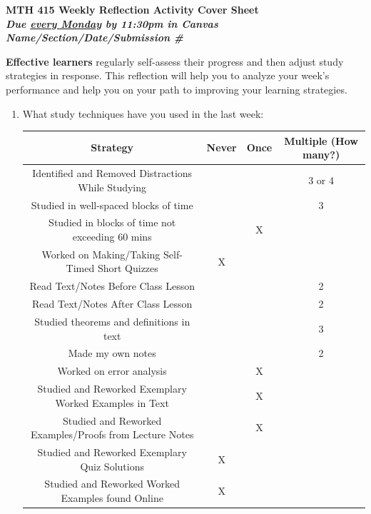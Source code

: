 \documentclass[10pt]{article}
\begin{document}
\begin{center}
\Large \bfseries MTH 415 Weekly Reflection Activity Cover Sheet\\ 
{\it Due \underline{every Monday} by 11:30pm in Canvas}\\ 
\smallskip
\it Name/Section/Date/Submission \# 
\end{center}

{\bf Effective learners} regularly self-assess their progress and then adjust study strategies in response. This reflection will help you to analyze your week's performance and help you on your path to improving your learning strategies.

\begin{enumerate}

\item What study techniques have you used in the last week:\\
	
	\begin{tabular}{|c|c|c|c|}
		\hline
		 {\bf Strategy} & {\bf Never} & {\bf Once} & {\bf Multiple (How many?)}\\
		\hline
		Identified and Removed Distractions While Studying &&&3 or 4\\
		\hline
		Studied in well-spaced blocks of time &&&3\\
		\hline
		Studied in blocks of time not exceeding 60 mins &&X&\\
		\hline
		Worked on Making/Taking Self-Timed Short Quizzes &X&&\\
		\hline
		\hline
		Read Text/Notes Before Class Lesson &&&2\\
		\hline
		Read Text/Notes After Class Lesson &&&2\\
		\hline
		\hline

		Studied theorems and definitions in text&&&3\\
		\hline 
		Made my own notes&&&2\\
		\hline 
		Worked on error analysis&&X&\\
		\hline 
		\hline
		 
		Studied and Reworked Exemplary Worked Examples in Text &&X&\\
		\hline 
		Studied and Reworked Examples/Proofs from Lecture Notes &&X&\\
		\hline 
		Studied and Reworked Exemplary Quiz Solutions &X&&\\
		\hline 
		Studied and Reworked Worked Examples found Online &X&&\\
		\hline 
		\hline
		

\end{tabular}
\end{enumerate}
\end{document}
